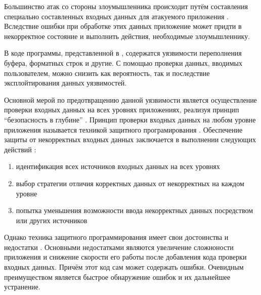 %
Большинство атак со стороны злоумышленника происходит путём составления специально составленных входных данных для атакуемого приложения . 
%
Вследствие ошибки при обработке этих данных приложение может придти в некорректное состояние и выполнить действия, необходимые злоумышленнику. 

%
В коде программы, представленной в , содержатся уязвимости переполнения буфера, форматных строк и другие. 
%
С помощью проверки данных, вводимых пользователем, можно снизить как вероятность, так и последствие эксплойтирования данных уязвимостей. 

%
Основной мерой по предотвращению данной уязвимости является осуществление проверки входных данных на всех уровнях приложениях, реализуя принцип “безопасность в глубине” . 
%
Принцип проверки входных данных на любом уровне приложения называется техникой защитного програмирования . 
%
Обеспечение защиты от некорректных входных данных заключается в выполнении следующих действий 
: 
\begin{enumerate}

	\item идентификация всех источников входных данных на всех уровнях 

	\item выбор стратегии отличия корректных данных от некорректных на каждом уровне 

	\item попытка уменьшения возможности ввода некорректных данных посредством  или других источников
\end{enumerate}

%
Однако техника защитного программирования имеет свои достоинства и недостатки 
. 
%
Основными недостатками являются увеличение сложноности приложения и снижение скорости его работы после добавления кода проверки входных данных. 
%
Причём этот код сам может содержать ошибки. 
%
Очевидным преимуществом является быстрое обнаружение ошибок и их дальнейшее устранение.



